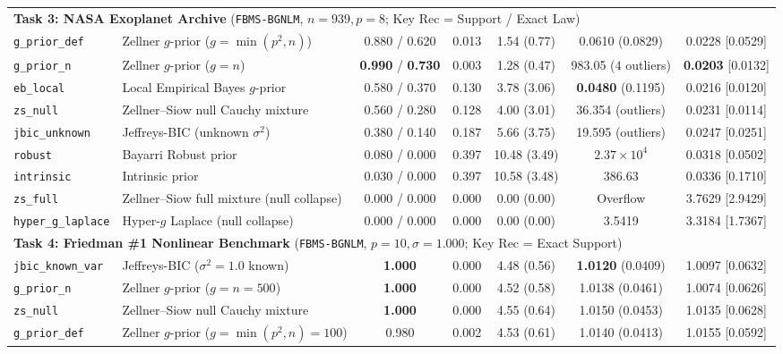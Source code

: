\documentclass[11pt,a4paper]{article}
\begin{document}
\begin{table}[htbp]
{\begin{tabular}{llccccc}
\midrule
\multicolumn{7}{l}{\textbf{Task 3: NASA Exoplanet Archive} (\texttt{FBMS-BGNLM}, $n = 939, p = 8$; Key Rec = Support / Exact Law)} \\
\texttt{g\_prior\_def} & Zellner $g$-prior ($g = \min(p^2, n)$) & 0.880 / 0.620 & 0.013 & 1.54 (0.77) & 0.0610 (0.0829) & 0.0228 [0.0529] \\
\texttt{g\_prior\_n} & Zellner $g$-prior ($g = n$) & \textbf{0.990} / \textbf{0.730} & 0.003 & 1.28 (0.47) & 983.05 ($4$ outliers) & \textbf{0.0203} [0.0132] \\
\texttt{eb\_local} & Local Empirical Bayes $g$-prior & 0.580 / 0.370 & 0.130 & 3.78 (3.06) & \textbf{0.0480} (0.1195) & 0.0216 [0.0120] \\
\texttt{zs\_null} & Zellner--Siow null Cauchy mixture & 0.560 / 0.280 & 0.128 & 4.00 (3.01) & 36.354 (outliers) & 0.0231 [0.0114] \\
\texttt{jbic\_unknown} & Jeffreys-BIC (unknown $\sigma^2$) & 0.380 / 0.140 & 0.187 & 5.66 (3.75) & 19.595 (outliers) & 0.0247 [0.0251] \\
\texttt{robust} & Bayarri Robust prior & 0.080 / 0.000 & 0.397 & 10.48 (3.49) & $2.37\!\times\!10^4$ & 0.0318 [0.0502] \\
\texttt{intrinsic} & Intrinsic prior & 0.030 / 0.000 & 0.397 & 10.58 (3.48) & 386.63 & 0.0336 [0.1710] \\
\texttt{zs\_full} & Zellner--Siow full mixture (null collapse) & 0.000 / 0.000 & 0.000 & 0.00 (0.00) & Overflow & 3.7629 [2.9429] \\
\texttt{hyper\_g\_laplace} & Hyper-$g$ Laplace (null collapse) & 0.000 / 0.000 & 0.000 & 0.00 (0.00) & 3.5419 & 3.3184 [1.7367] \\
\midrule
\multicolumn{7}{l}{\textbf{Task 4: Friedman \#1 Nonlinear Benchmark} (\texttt{FBMS-BGNLM}, $p = 10, \sigma = 1.000$; Key Rec = Exact Support)} \\
\texttt{jbic\_known\_var} & Jeffreys-BIC ($\sigma^2 = 1.0$ known) & \textbf{1.000} & 0.000 & 4.48 (0.56) & \textbf{1.0120} (0.0409) & 1.0097 [0.0632] \\
\texttt{g\_prior\_n} & Zellner $g$-prior ($g = n = 500$) & \textbf{1.000} & 0.000 & 4.52 (0.58) & 1.0138 (0.0461) & 1.0074 [0.0626] \\
\texttt{zs\_null} & Zellner--Siow null Cauchy mixture & \textbf{1.000} & 0.000 & 4.55 (0.64) & 1.0150 (0.0453) & 1.0135 [0.0628] \\
\texttt{g\_prior\_def} & Zellner $g$-prior ($g = \min(p^2, n) = 100$) & 0.980 & 0.002 & 4.53 (0.61) & 1.0140 (0.0413) & 1.0155 [0.0592] \\

\end{tabular}}
\end{table}
\end{document}

